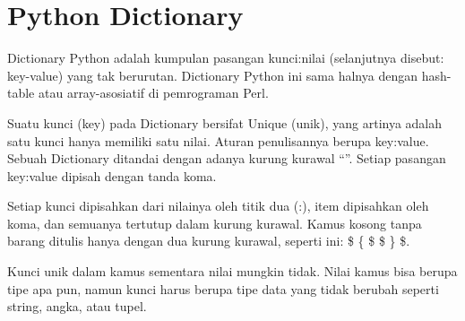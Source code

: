 \section{Python Dictionary}
Dictionary Python adalah kumpulan pasangan kunci:nilai (selanjutnya disebut: key-value) yang tak berurutan. Dictionary Python ini sama halnya dengan hash-table atau array-asosiatif di pemrograman Perl.

Suatu kunci (key) pada Dictionary bersifat Unique (unik), yang artinya adalah satu kunci hanya memiliki satu nilai. Aturan penulisannya berupa key:value. Sebuah Dictionary ditandai dengan adanya kurung kurawal “{}”. Setiap pasangan key:value dipisah dengan tanda koma. 

Setiap kunci dipisahkan dari nilainya oleh titik dua (:), item dipisahkan oleh koma, dan semuanya tertutup dalam kurung kurawal. Kamus kosong tanpa barang ditulis hanya dengan dua kurung kurawal, seperti ini:  \$  \{  \$ \$  \}  \$.

Kunci unik dalam kamus sementara nilai mungkin tidak. Nilai kamus bisa berupa tipe apa pun, namun kunci harus berupa tipe data yang tidak berubah seperti string, angka, atau tupel.

